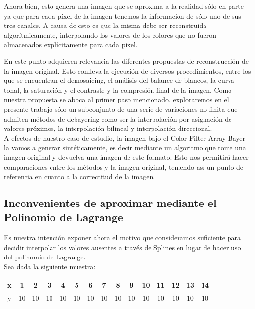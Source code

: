 \documentclass[a4paper]{article}
\begin{document}
Ahora bien, esto genera una imagen que se aproxima a la realidad sólo en parte ya que para cada p\'ixel de la imagen tenemos la informaci\'on de s\'olo uno de sus tres canales. A causa de esto es que la misma debe ser reconstruida algorítmicamente, interpolando los valores de los colores que no fueron almacenados explícitamente para cada pixel.


En este punto adquieren relevancia las diferentes propuestas de reconstrucción de la imagen original. Esto conlleva la ejecución de diversos procedimientos, entre los que se encuentran el demosaicing, el análisis del balance de blancos, la curva tonal, la saturación y el contraste y la compresión final de la imagen. Como nuestra propuesta se aboca al primer paso mencionado, exploraremos en el presente trabajo sólo un subconjunto de una serie de variaciones no finita que admiten métodos de debayering como ser la interpolación por asignación de valores próximos, la interpolación bilineal y interpolación direccional.\\

A efectos de nuestro caso de estudio, la imagen bajo el Color Filter Array Bayer la vamos a generar sint\'eticamente, es decir mediante un algoritmo que tome una imagen original y devuelva una imagen de este formato. Esto nos permitir\'a hacer comparaciones entre los m\'etodos y la imagen original, teniendo as\'i un punto de referencia en cuanto a la correctitud de la imagen.

\newpage
\subsection{Inconvenientes de aproximar mediante el Polinomio de Lagrange}


Es nuestra intención exponer ahora el motivo que consideramos suficiente para decidir interpolar los valores ausentes a través de Splines en lugar de hacer uso del polinomio de Lagrange.\\
Sea dada la siguiente muestra: \\
\smallskip


\begin{tabular}{ | c || c | c | c | c | c |c | c | c | c | c | c | c | c | c | c |}
 \hline                 
   x & 1 & 2 & 3 & 4 & 5 & 6 & 7 & 8 & 9 & 10 & 11 & 12 & 13 & 14 \\
 \hline    
y & 10 & 10 & 10& 10& 10& 10& 10& 10& 10& 10& 10& 10& 10& 10 \\
 \hline  
 \end{tabular}
\end{document}

